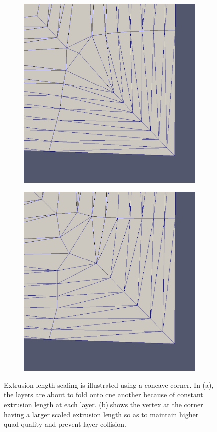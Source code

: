 \documentclass[conf]{new-aiaa}
\begin{document}
\begin{figure}
\centering
\begin{subfigure}{0.5\textwidth}
\includegraphics[width = 0.9\linewidth]{extrusionScaling/withoutScaling.eps}
\caption{}
\label{subfigure-extrusionScaling1}
\centering
\end{subfigure}%
\begin{subfigure}{0.5\textwidth}
\centering
\includegraphics[width = 0.9\linewidth]{extrusionScaling/withScaling.eps}
\caption{}
\label{subfigure-extrusionScaling2}
\end{subfigure}
\caption{Extrusion length scaling is illustrated using a concave corner. In (a), the layers are about to fold onto one another because of constant extrusion length at each layer. (b) shows the vertex at the corner having a larger scaled extrusion length so as to maintain higher quad quality and prevent layer collision.}
\label{fig-extrusionScaling}
\end{figure}
\end{document}

